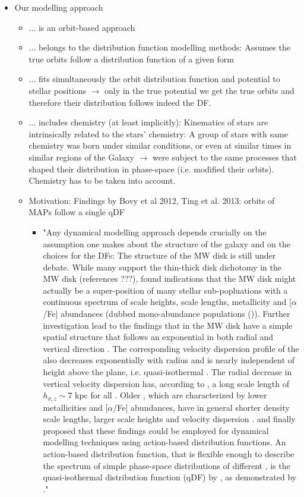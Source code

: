 \begin{itemize}
\item Our modelling approach
\begin{itemize}
\item ... is an orbit-based approach
\item ... belongs to the distribution function modelling methods: Assumes the true orbits follow a distribution function of a given form
\item ... fits simultaneously the orbit distribution function and potential to stellar positions $\rightarrow$ only in the true potential we get the true orbits and therefore their distribution follows indeed the DF.
\item ... includes chemistry (at least implicitly): Kinematics of stars are intrinsically related to the stars' chemistry: A group of stars with same chemistry was born under similar conditions, or even at similar times in similar regions of the Galaxy $\rightarrow$ were subject to the same processes that shaped their distribution in phase-space (i.e. modified their orbits). Chemistry has to be taken into account.
\item Motivation: Findings by Bovy et al 2012, Ting et al. 2013: orbits of MAPs follow a single qDF
\begin{itemize}
\item "Any dynamical modelling approach depends crucially on the assumption one makes about the structure of the galaxy and on the choices for the DFs: The structure of the MW disk is still under debate. While many support the thin-thick disk dichotomy in the MW disk (references ???), \citet{bov12b} found indications that the MW disk might actually be a super-position of many stellar sub-popluations with a continuous spectrum of scale heights, scale lengths, metallicity and [$\alpha$/Fe] abundances (dubbed mono-abundance populations (\MAPs)). Further investigation lead to the findings that \MAPs in the MW disk have a simple spatial structure that follows an exponential in both radial and vertical direction \citep{bov12d}. The corresponding velocity dispersion profile of the \MAPs also decreases exponentially with radius and is nearly independent of height above the plane, i.e. quasi-isothermal \citep{bov12c}. The radial decrease in vertical velocity dispersion has, according to \citet{bov12c}, a long scale length of $h_{\sigma,z} \sim 7$ kpc for all \MAPs. Older \MAPs, which are characterized by lower metallicities and [$\alpha$/Fe] abundances, have in general shorter density scale lengths, larger scale heights and velocity dispersion \citep{bov12d}. \citet{tin13} and \citet{bov13} finally proposed that these findings could be employed for dynamical modelling techniques using action-based distribution functions. An action-based distribution function, that is flexible enough to describe the spectrum of simple phase-space distributions of different \MAPs, is the quasi-isothermal distribution function (qDF) by \citet{bin11}, as demonstrated by \citet{tin13}."

\end{itemize}
\end{itemize}
\end{itemize}
